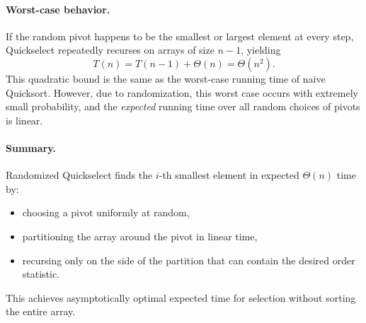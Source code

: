 \documentclass[9pt]{extarticle}
\begin{document}
\paragraph{Worst-case behavior.}
If the random pivot happens to be the smallest or largest element at every
step, Quickselect repeatedly recurses on arrays of size \(n-1\), yielding
\[
    T(n) = T(n-1) + \Theta(n) = \Theta(n^2).
\]
This quadratic bound is the same as the worst-case running time of naive
Quicksort.  However, due to randomization, this worst case occurs with extremely
small probability, and the \emph{expected} running time over all random choices
of pivots is linear.

\paragraph{Summary.}
Randomized Quickselect finds the \(i\)-th smallest element in expected
\(\Theta(n)\) time by:
\begin{itemize}
    \item choosing a pivot uniformly at random,
    \item partitioning the array around the pivot in linear time,
    \item recursing only on the side of the partition that can contain the
          desired order statistic.
\end{itemize}
This achieves asymptotically optimal expected time for selection without
sorting the entire array.
\end{document}
